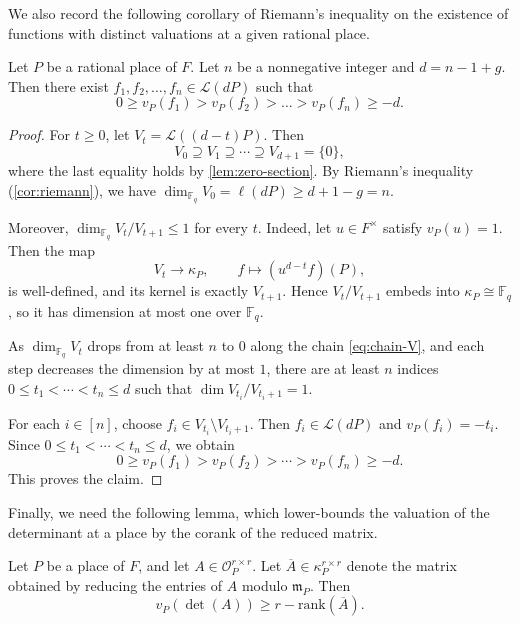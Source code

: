 \documentclass[11pt]{article}
\newcommand{\rank}{\mathrm{rank}}
\newcommand{\F}{\mathbb{F}}
\begin{document}
We also record the following corollary of Riemann's inequality on the existence of functions with distinct valuations at a given rational place.

\begin{corollary}\label{cor:interval}
Let $P$ be a rational place of $F$. Let $n$ be a nonnegative integer and $d=n-1+g$. Then there exist $f_1,f_2,\dots,f_n\in \mathcal{L}(d P)$ such that
\[
0\geq v_P(f_1)>v_P(f_2)>\dots >v_P(f_n)\geq -d.
\]
\end{corollary}

\begin{proof}
For $t\ge 0$, let $V_t=\mathcal{L}((d-t)P)$. Then
\begin{equation}\label{eq:chain-V}
V_0 \supseteq V_1 \supseteq \cdots \supseteq V_{d+1}=\{0\},
\end{equation}
where the last equality holds by \cref{lem:zero-section}.
By Riemann's inequality (\cref{cor:riemann}), we have $\dim_{\F_q} V_0=\ell(dP)\ge d+1-g=n$.

Moreover, $\dim_{\F_q} V_t/V_{t+1}\le 1$ for every $t$. Indeed, let $u\in F^\times$ satisfy $v_P(u)=1$. Then the map
\[
V_t \to \kappa_P,\qquad f\mapsto (u^{d-t} f)(P),
\]
is well-defined, and its kernel is exactly $V_{t+1}$. Hence $V_t/V_{t+1}$ embeds into $\kappa_P\cong\F_q$, so it has dimension at most one over $\F_q$.

As $\dim_{\F_q} V_t$ drops from at least $n$ to $0$ along the chain \eqref{eq:chain-V}, and each step decreases the dimension by at most $1$, there are at least $n$ indices $0\le t_1<\cdots<t_n\le d$ such that $\dim V_{t_i}/V_{t_i+1}=1$.

For each $i\in[n]$, choose $f_i\in V_{t_i}\setminus V_{t_i+1}$. Then $f_i\in \mathcal{L}(dP)$ and $v_P(f_i)=-t_i$. Since $0\leq t_1<\cdots<t_n\leq d$, we obtain
\[
0\ge v_P(f_1)>v_P(f_2)>\cdots>v_P(f_n)\ge -d.
\]
This proves the claim.
\end{proof}

Finally, we need the following lemma, which lower-bounds the valuation of the determinant at a place by the corank of the reduced matrix.

\begin{lemma}\label{lem:val-from-rank}
Let $P$ be a place of $F$, and let $A\in \mathcal{O}_P^{r\times r}$. Let
$\overline{A}\in \kappa_P^{r\times r}$ denote the matrix obtained by reducing the
entries of $A$ modulo $\mathfrak{m}_P$. Then
\[
v_P(\det(A))\ge r-\rank(\overline{A}).
\]
\end{lemma}
\end{document}
